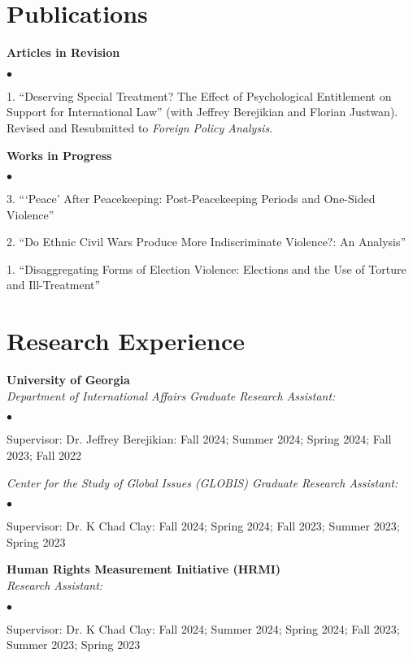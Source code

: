 \documentclass[letterpaper,12pt]{article}
\newenvironment{list2}{
  \begin{list}{$\bullet$}{%
      \setlength{\itemsep}{0in}
      \setlength{\parsep}{0in} 
      \setlength{\parskip}{0in}
      \setlength{\topsep}{0in} 
      \setlength{\partopsep}{0in}
      \setlength{\leftmargin}{1in}
      \setlength{\labelsep}{1em}
      \setlength{\labelwidth}{1em}
      \setlength{\itemindent}{-2em}
      \setlength{\listparindent}{2em}}}{\end{list}}
\begin{document}
\section{Publications}
\textbf{Articles in Revision}
\par
\begin{list2}
    \item[1.] ``Deserving Special Treatment? The Effect of Psychological Entitlement on Support for \mbox{International} Law” (with Jeffrey Berejikian and Florian Justwan). Revised and Resubmitted to \textit{Foreign \mbox{Policy} Analysis}.
\end{list2}
\par
\textbf{Works in Progress}
\par
\begin{list2}
    \item[3.] ```Peace' After Peacekeeping: Post-Peacekeeping Periods and One-Sided Violence”
    \item[2.] ``Do Ethnic Civil Wars Produce More Indiscriminate Violence?: An Analysis”
    \item[1.] ``Disaggregating Forms of Election Violence: Elections and the Use of Torture and Ill-Treatment” 
\end{list2}

\section{Research Experience}
\textbf{University of Georgia}\\
\textit{Department of International Affairs Graduate Research Assistant:}
\begin{list2}
    \item Supervisor: Dr. Jeffrey Berejikian: Fall 2024; Summer 2024; Spring 2024; Fall 2023; Fall 2022
\end{list2}
\par
\textit{Center for the Study of Global Issues (GLOBIS) Graduate Research Assistant:}
\begin{list2}
    \item Supervisor: Dr. K Chad Clay: Fall 2024; Spring 2024; Fall 2023; Summer 2023; Spring 2023
\end{list2}
\par
\textbf{Human Rights Measurement Initiative (HRMI)}\\
\textit{Research Assistant:}
\begin{list2}
    \item Supervisor: Dr. K Chad Clay: Fall 2024; Summer 2024; Spring 2024; Fall 2023; Summer 2023; Spring 2023
\end{list2}
\end{document}
